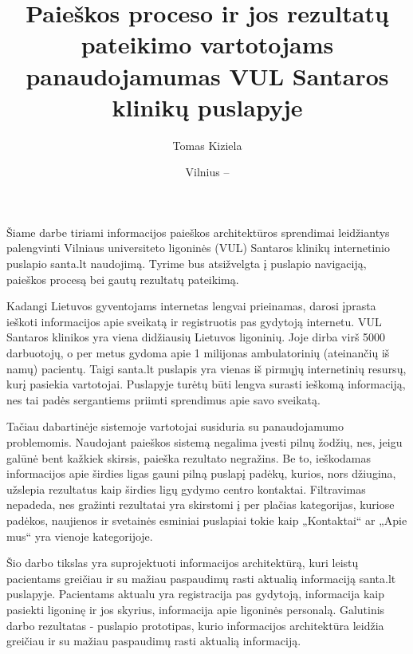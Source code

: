 \documentclass{VUMIFPSkursinis}
\title{Paieškos proceso ir jos rezultatų pateikimo vartotojams panaudojamumas VUL Santaros klinikų puslapyje}
\author{Tomas Kiziela}
\date{Vilnius – \the\year}
\begin{document}
	
\maketitle
\cleardoublepage{}
\setcounter{page}{2}

\tableofcontents

Šiame darbe tiriami informacijos paieškos architektūros sprendimai leidžiantys palengvinti Vilniaus universiteto ligoninės (VUL) Santaros klinikų internetinio puslapio santa.lt naudojimą. Tyrime bus atsižvelgta į puslapio navigaciją, paieškos procesą bei gautų rezultatų pateikimą.

Kadangi Lietuvos gyventojams internetas lengvai prieinamas, darosi įprasta ieškoti informacijos apie sveikatą ir registruotis pas gydytoją internetu\cite{InternetUseByPublicSAEn}\cite{InternetUseByPublicHKEn}. VUL Santaros klinikos yra viena didžiausių Lietuvos ligoninių. Joje dirba virš 5000 darbuotojų, o per metus gydoma apie 1 milijonas ambulatorinių (ateinančių iš namų) pacientų\cite{VulSkApieMusLt}. Taigi santa.lt puslapis yra vienas iš pirmųjų internetinių resursų, kurį pasiekia vartotojai. Puslapyje turėtų būti lengva surasti ieškomą informaciją, nes tai padės sergantiems priimti sprendimus apie savo sveikatą.

Tačiau dabartinėje sistemoje vartotojai susiduria su panaudojamumo problemomis. Naudojant paieškos sistemą negalima įvesti pilnų žodžių, nes, jeigu galūnė bent kažkiek skirsis, paieška rezultato negražins. Be to, ieškodamas informacijos apie širdies ligas gauni pilną puslapį padėkų, kurios, nors džiugina, užslepia rezultatus kaip širdies ligų gydymo centro kontaktai. Filtravimas nepadeda, nes gražinti rezultatai yra skirstomi į per plačias kategorijas, kuriose padėkos, naujienos ir svetainės esminiai puslapiai tokie kaip „Kontaktai“ ar „Apie mus“ yra vienoje kategorijoje. 

Šio darbo tikslas yra suprojektuoti informacijos architektūrą, kuri leistų pacientams greičiau ir su mažiau paspaudimų rasti aktualią informaciją santa.lt puslapyje. Pacientams aktualu yra registracija pas gydytoją, informacija kaip pasiekti ligoninę ir jos skyrius, informacija apie ligoninės personalą. Galutinis darbo rezultatas - puslapio prototipas, kurio informacijos architektūra leidžia greičiau ir su mažiau paspaudimų rasti aktualią informaciją.
\end{document}
